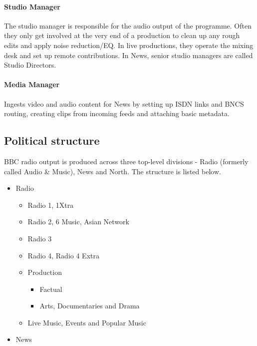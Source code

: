 \paragraph{Studio Manager}
The studio manager is responsible for the audio output of the programme. Often
they only get involved at the very end of a production to clean up any rough
edits and apply noise reduction/EQ. In live productions, they operate the
mixing desk and set up remote contributions. In News, senior studio managers
are called Studio Directors.



\paragraph{Media Manager}
Ingests video and audio content for News by setting up ISDN links and BNCS
routing, creating clips from incoming feeds and attaching basic metadata.

\subsection{Political structure}\label{sec:organisation}
BBC radio output is produced across three top-level divisions - Radio (formerly
called Audio \& Music), News and North. The structure is listed below.

\begin{itemize}
  \item Radio
  \begin{itemize}
    \item Radio 1, 1Xtra
    \item Radio 2, 6 Music, Asian Network
    \item Radio 3
    \item Radio 4, Radio 4 Extra
    \item Production
    \begin{itemize}
      \item Factual
      \item Arts, Documentaries and Drama
    \end{itemize}
    \item Live Music, Events and Popular Music
  \end{itemize}
  \item News
\end{itemize}

